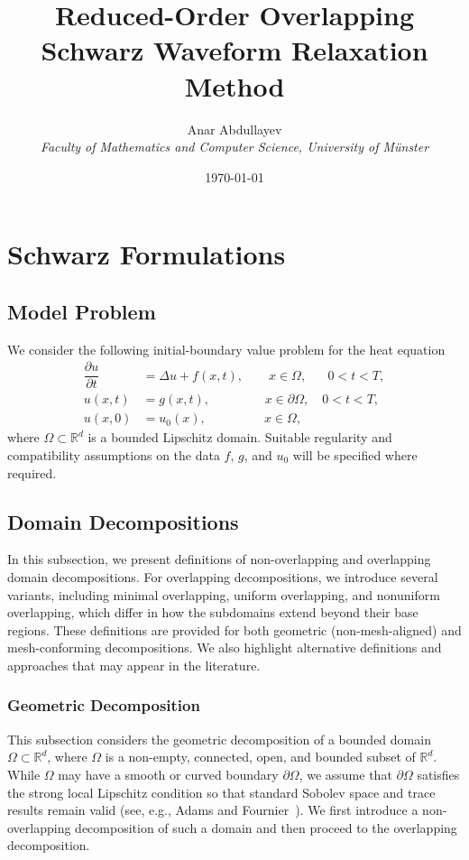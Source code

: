 \documentclass[a4paper, 11pt]{article}
\title{Reduced-Order Overlapping Schwarz Waveform Relaxation Method}
\author{Anar Abdullayev\\[2ex]\textit{Faculty of Mathematics and Computer Science, University of Münster}}
\date{\today}
\theoremstyle{remark}
\begin{document}
\maketitle

\section{Schwarz Formulations}

\subsection{Model Problem}
We consider the following initial-boundary value problem for the heat equation
\begin{align*}
    \dfrac{\partial u}{\partial t} &= \Delta u + f(x, t), \qquad x\in \Omega, \,\,\,\,\quad 0<t<T,\\
    u(x, t) &= g(x, t), \hspace{52pt} x\in \partial\Omega, \quad 0<t<T,\\
    u(x, 0) &= u_{0}(x), \hspace{55pt} x\in \Omega,
\end{align*}
where $\Omega\subset \mathbb{R}^{d}$ is a bounded Lipschitz domain. Suitable regularity and compatibility assumptions on the data $f$, $g$, and $u_{0}$ will be specified where required.

\newpage
\subsection{Domain Decompositions}
In this subsection, we present definitions of non-overlapping and overlapping domain decompositions. For overlapping decompositions, we introduce several variants, including minimal overlapping, uniform overlapping, and nonuniform overlapping, which differ in how the subdomains extend beyond their base regions. These definitions are provided for both geometric (non-mesh-aligned) and mesh-conforming decompositions. We also highlight alternative definitions and approaches that may appear in the literature.

\subsubsection{Geometric Decomposition}

This subsection considers the geometric decomposition of a bounded domain $\Omega \subset \mathbb{R}^{d}$, where $\Omega$ is a non-empty, connected, open, and bounded subset of $\mathbb{R}^{d}$. While $\Omega$ may have a smooth or curved boundary $\partial\Omega$, we assume that $\partial\Omega$ satisfies the strong local Lipschitz condition so that standard Sobolev space and trace results remain valid (see, e.g., Adams and Fournier~\cite{AdamsFournier2003}). We first introduce a non-overlapping decomposition of such a domain and then proceed to the overlapping decomposition.
\end{document}

